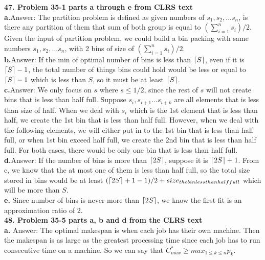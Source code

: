 \documentclass{article}
\DeclarePairedDelimiter\ceil{\lceil}{\rceil}
\begin{document}
\textbf{47. Problem 35-1 parts a through e from CLRS text} \\ \newline
\textbf{a.}Answer: 
The partition problem is defined as given numbers of $s_1, s_2, ... s_n$, is there any partition of them that sum of both group is equal to $(\sum_{i=1}^{n} s_i)/2$. Given the input of partition problem, we could build a bin packing with same numbers $s_1, s_2, ... s_n$, with 2 bins of size of $(\sum_{i=1}^{n} s_i)/2$.
\\ \newline
\textbf{b.}Answer: 
If the min of optimal number of bins is less than  $\ceil*{S}$, even if it is  $\ceil*{S} - 1$, the total number of things bins could hold would be less or equal to
$\ceil*{S} - 1$ which is less than $S$, so it must be at least $\ceil*{S}$.
\\ \newline
\textbf{c.}Answer:
We only focus on $s$ where $s\leq1/2$, since the rest of $s$ will not create bins that is less than half full. Suppose $s_i, s_{i+1} ... s_{i+k}$ are all elements that is less than size of half. When we deal with $s_i$ which is the 1st element that is less than half, we create the 1st bin that is less than half full. However, when we deal with the following elements, we will either put in to the 1st bin that is less than half full, or when 1st bin exceed half full, we create the 2nd bin that is less than half full. For both cases, there would be only one bin that is less than half full.
\\ \newline
\textbf{d.}Answer:
If the number of bins is more than $\ceil*{2S}$, suppose it is $\ceil*{2S}+1$. From c, we know that the at most one of them is less than half full, so the total size stored in bins would be at least $(\ceil*{2S} +1 - 1)/2 + size_{the bin less than half full} $ which will be more than $S$.
\\ \newline
\textbf{e.}
Since number of bins is never more than $\ceil*{2S}$, we know the first-fit is an approximation ratio of 2.
\\ \newline
\textbf{48. Problem 35-5 parts a, b and d from the CLRS text} \\ \newline
\textbf{a.}
Answer: The optimal makespan is when each job has their own machine. Then the makespan is as large as the greatest processing time since each job has to run consecutive time on a machine. So we can say that $C_{max}^{*} \geq max_{1\leq k \leq n}p_k$.\\ \newline
\end{document}
